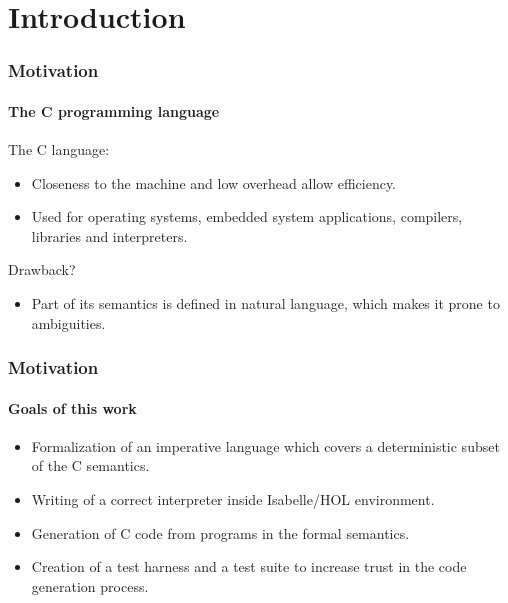 \section{Introduction}

\begin{frame}
\frametitle{Motivation}
\framesubtitle{The C programming language}

\pause

The C language:

\pause

\begin{itemize}
\item{Closeness to the machine and low overhead allow efficiency.}
\pause
\item{Used for operating systems, embedded system applications, compilers, libraries and interpreters.}
\pause
\end{itemize}

Drawback?
\pause
\begin{itemize}
\item{Part of its semantics is defined in natural language, which makes it prone to ambiguities.}
\end{itemize}

\end{frame}


\begin{frame}
\frametitle{Motivation}
\framesubtitle{Goals of this work}

\pause
\begin{itemize}
\item{Formalization of an imperative language which covers a deterministic subset of the C semantics.}
\pause
\item{Writing of a correct interpreter inside Isabelle/HOL environment.}
\pause
\item{Generation of C code from programs in the formal semantics.}
\pause
\item{Creation of a test harness and a test suite to increase trust in the code generation process.}
\end{itemize}

\end{frame}



